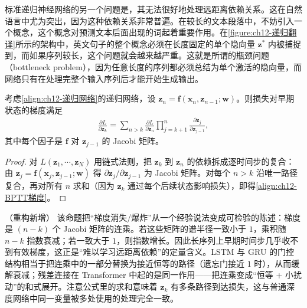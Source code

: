 \documentclass[../../main.tex]{subfiles}
\begin{document}
标准递归神经网络的另一个问题是，其无法很好地处理远距离依赖关系。这在自然语言中尤为突出，因为这种依赖关系非常普遍。在较长的文本段落中，不妨引入一个概念，这个概念对预测文本后面出现的词起着重要作用。在\cref{figure:ch12-递归翻译}所示的架构中，英文句子的整个概念必须在长度固定的单个隐向量 $\mathbf{z}^{*}$ 内被捕捉到，而如果序列较长，这个问题就会越来越严重。这就是所谓的瓶颈问题（bottleneck problem），因为任意长度的序列都必须总结为单个激活的隐向量，而网络只有在处理完整个输入序列后才能开始生成输出。

\begin{proposition}[通过时间反向传播的梯度连乘]\label{proposition:ch12-BPTT}
考虑\eqref{align:ch12-递归网络}的递归网络，设 $\mathbf{z}_n=\mathbf{f}(\mathbf{x}_n,\mathbf{z}_{n-1};\mathbf{w})$。则损失对早期状态的梯度满足
\begin{align}
\frac{\partial L}{\partial\mathbf{z}_{k}}=\sum_{n>k}\frac{\partial L}{\partial\mathbf{z}_{n}}\prod_{j=k+1}^{n}\frac{\partial\mathbf{z}_{j}}{\partial\mathbf{z}_{j-1}},
\label{align:ch12-BPTT梯度}
\end{align}
其中每个因子是 $\mathbf{f}$ 对 $\mathbf{z}_{j-1}$ 的 Jacobi 矩阵。
\end{proposition}

\begin{proof}
对 $L(\mathbf{z}_1,\cdots,\mathbf{z}_N)$ 用链式法则，把 $\mathbf{z}_k$ 到 $\mathbf{z}_n$ 的依赖拆成逐时间步的复合：由 $\mathbf{z}_{j}=\mathbf{f}(\mathbf{x}_j,\mathbf{z}_{j-1};\mathbf{w})$ 得 $\partial\mathbf{z}_{j}/\partial\mathbf{z}_{j-1}$ 为 Jacobi 矩阵。对每个 $n>k$ 沿唯一路径复合，再对所有 $n$ 求和（因为 $\mathbf{z}_k$ 通过每个后续状态影响损失），即得\eqref{align:ch12-BPTT梯度}。
\end{proof}

\begin{remark}（重构新增）
该命题把“梯度消失/爆炸”从一个经验说法变成可检验的陈述：梯度是 $(n-k)$ 个 Jacobi 矩阵的连乘。若这些矩阵的谱半径一致小于 $1$，乘积随 $n-k$ 指数衰减；若一致大于 $1$，则指数增长。因此长序列上早期时间步几乎收不到有效梯度，这正是“难以学习远距离依赖”的定量含义。LSTM 与 GRU 的门控结构相当于把连乘中的一部分替换为接近恒等的路径（遗忘门接近 $1$ 时），从而缓解衰减；残差连接在 Transformer 中起的是同一作用——把连乘变成“恒等 + 小扰动”的和式展开。注意公式里的求和意味着 $\mathbf{z}_k$ 有多条路径到达损失，这与普通深度网络中同一变量被多处使用的处理完全一致。
\end{remark}
\end{document}
